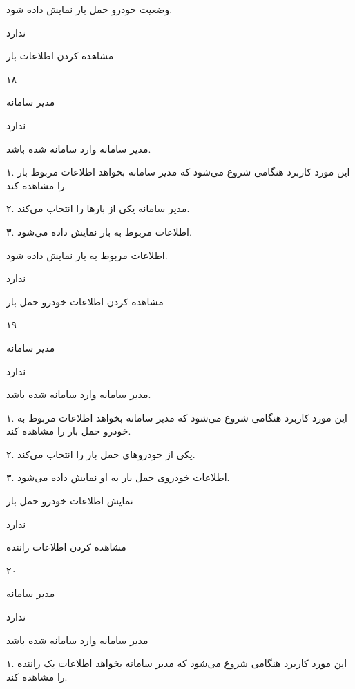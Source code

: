وضعیت خودرو حمل بار نمایش داده شود.

ندارد

\newpage

مشاهده کردن اطلاعات بار

۱۸

مدیر سامانه

ندارد

مدیر سامانه وارد سامانه شده باشد.


۱. این مورد کاربرد هنگامی شروع می‌شود که مدیر سامانه بخواهد اطلاعات مربوط بار را مشاهده کند.

۲. مدیر سامانه یکی از بارها را انتخاب می‌کند.

۳. اطلاعات مربوط به بار نمایش داده می‌شود.

اطلاعات مربوط به بار نمایش داده شود.

ندارد

\newpage

مشاهده کردن اطلاعات خودرو حمل بار

۱۹

مدیر سامانه

ندارد

مدیر سامانه وارد سامانه شده باشد.


۱. این مورد کاربرد هنگامی شروع می‌شود که مدیر سامانه بخواهد اطلاعات مربوط به خودرو حمل بار را مشاهده کند.

۲. یکی از خودروهای حمل بار را انتخاب می‌کند.

۳. اطلاعات خودروی حمل بار به او نمایش داده می‌شود.

نمایش اطلاعات خودرو حمل بار

ندارد

\newpage



مشاهده کردن اطلاعات راننده

۲۰

مدیر سامانه

ندارد

مدیر سامانه وارد سامانه شده باشد


۱. این مورد کاربرد هنگامی شروع می‌شود که مدیر سامانه بخواهد اطلاعات یک راننده را مشاهده کند.

